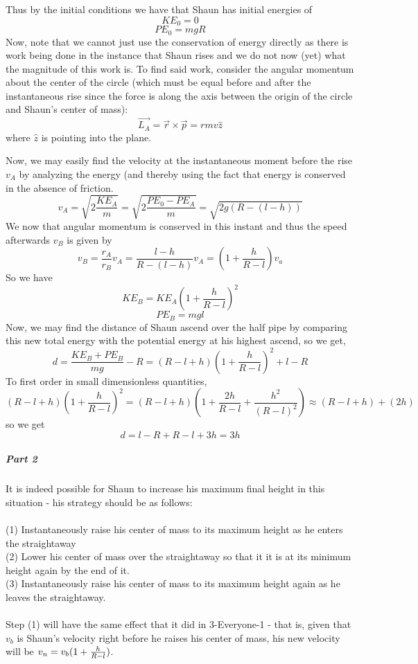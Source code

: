 Thus by the initial conditions we have that Shaun has initial energies of
\[ KE_0 = 0 \]
\[ PE_0 = mgR \]
Now, note that we cannot just use the conservation of energy directly as there is work being done in the instance that Shaun rises and we do not now (yet) what the magnitude of this work is. To find said work, consider the angular momentum about the center of the circle (which must be equal before and after the instantaneous rise since the force is along the axis between the origin of the circle and Shaun's center of mass):
\[ \vec{L_A} = \vec r \times \vec p = rmv \hat{z} \]
where $\hat{z}$ is pointing into the plane. \par
Now, we may easily find the velocity at the instantaneous moment before the rise $v_A$ by analyzing the energy (and thereby using the fact that energy is conserved in the absence of friction.
\[ v_A=\sqrt{2\frac{KE_A}{m}} = \sqrt{2\frac{PE_0-PE_A}{m}} = \sqrt{2g(R-(l-h))}  \]
We now that angular momentum is conserved in this instant and thus the speed afterwards $v_B$ is given by
\[ v_B = \frac{r_A}{r_B} v_A = \frac{l-h}{R-(l-h)} v_A = \left(1+\frac{h}{R-l}\right) v_a \]
So we have
\[ KE_B = KE_A\left(1+\frac{h}{R-l}\right)^2 \]
\[ PE_B = mgl \]
Now, we may find the distance of Shaun ascend over the half pipe by comparing this new total energy with the potential energy at his highest ascend, so we get, 
\[ d=\frac{KE_B+PE_B}{mg}-R = \left(R-l+h\right)\left(1+\frac{h}{R-l}\right)^2+l-R\]
To first order in small dimensionless quantities, 
\[ \left(R-l+h\right)\left(1+\frac{h}{R-l}\right)^2 = \left(R-l+h\right) \left(1+\frac{2h}{R-l}+\frac{h^2}{(R-l)^2}\right) \approx (R-l+h)+(2h) \]
so we get
\[ d = l-R + R - l + 3h =3h \]
\subparagraph{Part 2}
It is indeed possible for Shaun to increase his maximum final height in this situation - his strategy should be as follows:
\\\\ (1) Instantaneously raise his center of mass to its maximum height as he enters the straightaway
\\ (2) Lower his center of mass over the straightaway so that it it is at its minimum height again by the end of it.
\\ (3) Instantaneously raise his center of mass to its maximum height again as he leaves the straightaway.
\\\\ Step (1) will have the same effect that it did in 3-Everyone-1 - that is, given that $v_b$ is Shaun's velocity right before he raises his center of mass, his new velocity will be $v_n=v_b (1+\frac{h}{R-l})$.  
